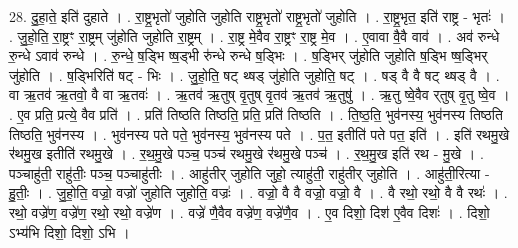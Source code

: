 \documentclass[17pt]{extarticle}
\begin{document}
28. दु॒हा॒ते॒ इति॑ दुहाते । . रा॒ष्ट्र॒भृतो॑ जुहोति जुहोति राष्ट्र॒भृतो॑ राष्ट्र॒भृतो॑ जुहोति । . रा॒ष्ट्र॒भृत॒ इति॑ राष्ट्र - भृतः॑ । . जु॒हो॒ति॒ रा॒ष्ट्रꣳ रा॒ष्ट्रम् जु॑होति जुहोति रा॒ष्ट्रम् । . रा॒ष्ट्र मे॒वैव रा॒ष्ट्रꣳ रा॒ष्ट्र मे॒व । . ए॒वावा वै॒वै वाव॑ । . अव॑ रुन्धे रु॒न्धे ऽवाव॑ रुन्धे । . रु॒न्धे॒ ष॒ड्भि ष्ष॒ड्भी रु॑न्धे रुन्धे ष॒ड्भिः । . ष॒ड्भिर् जु॑होति जुहोति ष॒ड्भि ष्ष॒ड्भिर् जु॑होति । . ष॒ड्भिरिति॑ षट् - भिः । . जु॒हो॒ति॒ षट् थ्षड् जु॑होति जुहोति॒ षट् । . षड् वै वै षट् थ्षड् वै । . वा ऋ॒तव॑ ऋ॒तवो॒ वै वा ऋ॒तवः॑ । . ऋ॒तव॑ ऋ॒तुष् वृ॒तुष् वृ॒तव॑ ऋ॒तव॑ ऋ॒तुषु॑ । . ऋ॒तु ष्वे॒वैव र्‌तुष् वृ॒तु ष्वे॒व । . ए॒व प्रति॒ प्रत्ये॒ वैव प्रति॑ । . प्रति॑ तिष्ठति तिष्ठति॒ प्रति॒ प्रति॑ तिष्ठति । . ति॒ष्ठ॒ति॒ भुव॑नस्य॒ भुव॑नस्य तिष्ठति तिष्ठति॒ भुव॑नस्य । . भुव॑नस्य पते पते॒ भुव॑नस्य॒ भुव॑नस्य पते । . प॒त॒ इतीति॑ पते पत॒ इति॑ । . इति॑ रथमु॒खे र॑थमु॒ख इतीति॑ रथमु॒खे । . र॒थ॒मु॒खे पञ्च॒ पञ्च॑ रथमु॒खे र॑थमु॒खे पञ्च॑ । . र॒थ॒मु॒ख इति॑ रथ - मु॒खे । . पञ्चाहु॑ती॒ राहु॑तीः॒ पञ्च॒ पञ्चाहु॑तीः । . आहु॑तीर् जुहोति जुहो॒ त्याहु॑ती॒ राहु॑तीर् जुहोति । . आहु॑ती॒रित्या - हु॒तीः॒ । . जु॒हो॒ति॒ वज्रो॒ वज्रो॑ जुहोति जुहोति॒ वज्रः॑ । . वज्रो॒ वै वै वज्रो॒ वज्रो॒ वै । . वै रथो॒ रथो॒ वै वै रथः॑ । . रथो॒ वज्रे॑ण॒ वज्रे॑ण॒ रथो॒ रथो॒ वज्रे॑ण । . वज्रे॑ णै॒वैव वज्रे॑ण॒ वज्रे॑णै॒व । . ए॒व दिशो॒ दिश॑ ए॒वैव दिशः॑ । . दिशो॒ ऽभ्य॑भि दिशो॒ दिशो॒ ऽभि । \newline
\end{document}
